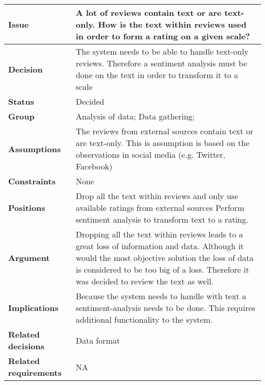 
\begin{tabular}{ l  p{10cm}}
\hline
\bf Issue & A lot of reviews contain text or are text-only. How is the text within reviews used in order to form a rating on a given scale?\\
\hline
\bf Decision & The system needs to be able to handle text-only reviews. Therefore a sentiment analysis must be done on the text in order to transform it to a scale\\
\hline
\bf Status & Decided\\
\hline
\bf Group & Analysis of data; Data gathering; \\
\hline
\bf Assumptions & The reviews from external sources contain text or are text-only. This is assumption is based on the observations in social media (e.g. Twitter, Facebook) \\
\hline
\bf Constraints & None \\
\hline
\bf Positions & Drop all the text within reviews and only use available ratings from external sources \newline\newline
Perform sentiment analysis to transform text to a rating. \\
\hline
\bf Argument & Dropping all the text within reviews leads to a great loss of information and data. Although it would the most objective solution the loss of data is considered to be too big of a loss. Therefore it was decided to review the text as well. \\
\hline
\bf Implications & Because the system needs to handle with text a sentiment-analysis needs to be done. This requires additional functionality to the system.\\
\hline
\bf Related decisions & Data format \\
\hline
\bf Related requirements  & NA \\
\hline
\end{tabular}
